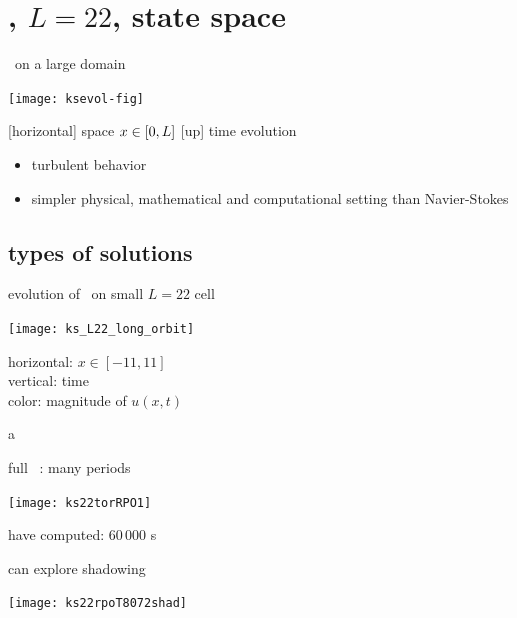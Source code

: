 \section[KSe, $L=22$]{\KS, $L=22$, state space }
\begin{frame}{\KS\ on a large domain}
\begin{center}
  \texttt{[image: ksevol-fig]} %
\end{center}

{\footnotesize
[horizontal] space $x \in [0,L]$
\qquad
{[up]} time evolution
}

\begin{itemize}
\item turbulent behavior
\item simpler physical, mathematical and computational setting than Navier-Stokes
\end{itemize}
\end{frame}


\subsection{types of solutions}
\begin{frame}{evolution of \KS\ on small $L=22$ cell}
\begin{center}
  \texttt{[image: ks\_L22\_long\_orbit]}
\end{center}
horizontal: $x \in [-11,11]$
\\
vertical: time
\\
color: magnitude of $u(x,t)$
\end{frame}

\begin{frame}{a \rpo}
\begin{block}{full \statesp\ : many periods}
\begin{center}
\texttt{[image: ks22torRPO1]}
\end{center}
\end{block}
have computed: 60\,000 \po s
\end{frame}

\begin{frame}{can explore shadowing}
\begin{center}
\texttt{[image: ks22rpoT8072shad]}
\end{center}
\hfill \color{red}{(impossible without symmetry reduction)}
\end{frame}

